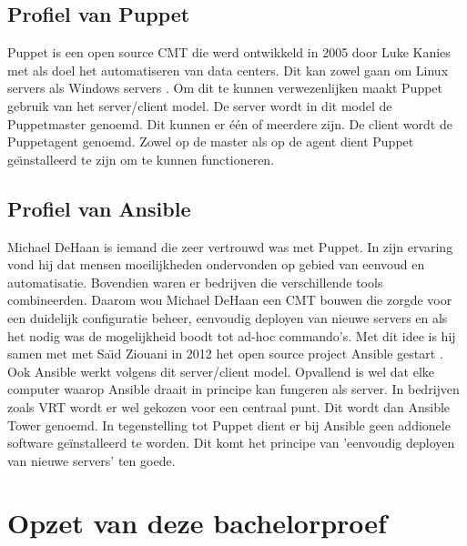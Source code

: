 \subsection{Profiel van Puppet}
Puppet is een open source CMT die werd ontwikkeld in 2005 door Luke Kanies \autocite{PuppetLeaders} met als doel het automatiseren van data centers. Dit kan zowel gaan om Linux servers als Windows servers \autocite{PuppetForWindows}. Om dit te kunnen verwezenlijken maakt Puppet gebruik van  het server/client model. De server wordt in dit model de Puppetmaster genoemd. Dit kunnen er  \'e\'en of meerdere zijn.  De client wordt de Puppetagent genoemd. Zowel op de master als op de agent dient Puppet ge{\"\i}nstalleerd te zijn om te kunnen functioneren. \autocite{Puppetdoc} \autocite{puppetfaq}


\subsection{Profiel van Ansible}
Michael DeHaan is iemand die zeer vertrouwd was met Puppet. In zijn ervaring vond hij dat mensen moeilijkheden ondervonden op gebied van eenvoud en automatisatie. Bovendien waren er bedrijven die verschillende tools combineerden. Daarom wou Michael DeHaan een CMT bouwen die zorgde voor een duidelijk configuratie beheer, eenvoudig deployen van nieuwe servers en als het nodig was de mogelijkheid boodt tot ad-hoc commando's. Met dit idee is hij samen met met Sa{\"\i}d Ziouani in 2012 het open source project Ansible gestart \autocite{ansiblefordevops}. Ook Ansible werkt volgens dit server/client model. Opvallend is wel dat elke computer waarop Ansible draait in principe kan fungeren als server. In bedrijven zoals VRT wordt er wel gekozen voor een centraal punt. Dit wordt dan Ansible Tower genoemd. In tegenstelling tot Puppet dient er bij Ansible geen addionele software ge\"installeerd te worden. Dit komt het principe van 'eenvoudig deployen van nieuwe servers' ten goede.









\section{Opzet van deze bachelorproef}
\label{sec:opzet-bachelorproef}



